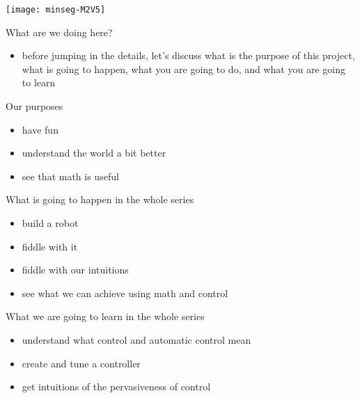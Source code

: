 \begin{frame}
	\titlepage
	\vspace{-1.8cm} 
	\begin{center}
		\texttt{[image: minseg-M2V5]}
	\end{center}
\end{frame}


\begin{frame}{What are we doing here?}
	\begin{itemize}
		\item before jumping in the details, let's discuss what is the purpose of this project, what is going to happen, what you are going to do, and what you are going to learn
	\end{itemize}
\end{frame}


\begin{frame}{Our purposes}
	\pause
	\begin{itemize}
		\item have fun
		\pause
		\item understand the world a bit better
		\pause
		\item see that math is useful
	\end{itemize}
\end{frame}


\begin{frame}{What is going to happen in the whole series}
	\pause
	\begin{itemize}
		\item build a robot
		\pause
		\item fiddle with it
		\pause
		\item fiddle with our intuitions
		\pause
		\item see what we can achieve using math and control
	\end{itemize}
\end{frame}


\begin{frame}{What we are going to learn in the whole series}
	\pause
	\begin{itemize}
		\item understand what control and automatic control mean
		\pause
		\item create and tune a controller 
		\pause
		\item get intuitions of the pervasiveness of control
	\end{itemize}
\end{frame}


